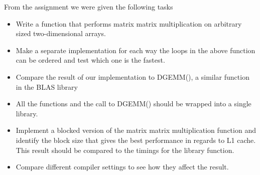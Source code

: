 From the assignment we were given the following tasks

\begin{itemize}
\item Write a function that performs matrix matrix multiplication on arbitrary sized two-dimensional arrays.
\item Make a separate implementation for each way the loops in the above function can be ordered and test which one is the fastest.
\item Compare the result of our implementation to DGEMM(), a similar function in the BLAS library
\item All the functions and the call to DGEMM() should be wrapped into a single library.
\item Implement a blocked version of the matrix matrix multiplication function and identify the block size that gives the best performance in regards to L1 cache. This result should be compared to the timings for the library function.
\item Compare different compiler settings to see how they affect the result.

\end{itemize}